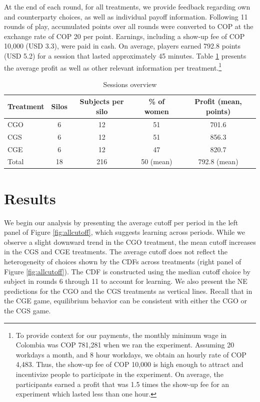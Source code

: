 \documentclass[12pt, letterpaper]{article}
\theoremstyle{plain}
\begin{document}
At the end of each round, for all treatments, we provide feedback regarding own and counterparty choices, as well as individual payoff information. Following 11 rounds of play, accumulated points over all rounds were converted to COP at the exchange rate of COP 20 per point. Earnings, including a show-up fee of COP 10,000 (USD 3.3), were paid in cash. On average, players earned 792.8 points (USD 5.2) for a session that lasted approximately 45 minutes. Table \ref{session} presents the average profit as well as other relevant information per treatment.\footnote{To provide context for our payments, the monthly minimum wage in Colombia was COP 781,281 when we ran the experiment. Assuming 20 workdays a month, and 8 hour workdays, we obtain an hourly rate of COP 4,483. Thus, the show-up fee of COP 10,000 is high enough to attract and incentivize people to participate in the experiment. On average, the participants earned a profit that was 1.5 times the show-up fee for an experiment which lasted less than one hour.} 
\begin{table}[ht]
\centering
\caption{Sessions overview }
\hline
\begin{tabular}{lcccc}
  Treatment & Silos & Subjects per silo & \% of women & Profit (mean, points)\\
  \hline  
  CGO & 6 & 12 & 51 & 701.6 \\
  CGS & 6 & 12 & 51 & 856.3 \\
  CGE & 6 & 12 & 47 & 820.7 \\
\hline
Total & 18 & 216 &  50 (mean) & 792.8 (mean)\\
\end{tabular}

\label{session}
\end{table}

\section{Results}
\label{sec:results}

We begin our analysis by presenting the average cutoff per period in the left panel of Figure \ref{fig:allcutoff}, which suggests learning across periods. While we observe a slight downward trend in the CGO treatment, the mean cutoff increases in the CGS and CGE treatments. The average cutoff does not reflect the heterogeneity of choices shown by the CDFs across treatments (right panel of Figure \ref{fig:allcutoff}). The CDF is constructed using the median cutoff choice by subject in rounds 6 through 11 to account for learning. We also present the NE predictions for the CGO and the CGS treatments as vertical lines. Recall that in the CGE game, equilibrium behavior can be consistent with either the CGO or the CGS game. \\
\end{document}
